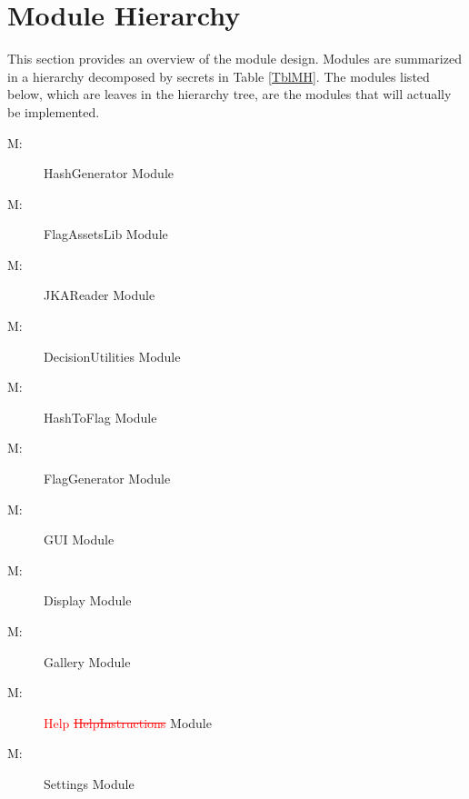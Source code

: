 \documentclass[12pt, titlepage]{article}
\newcounter{mnum}
\newcommand{\mthemnum}{M\themnum}
\begin{document}
\section{Module Hierarchy} \label{SecMH}

This section provides an overview of the module design. Modules are summarized
in a hierarchy decomposed by secrets in Table \ref{TblMH}. The modules listed
below, which are leaves in the hierarchy tree, are the modules that will
actually be implemented.

\begin{description}
\item [ \mthemnum \label{M1}:] HashGenerator Module
\item [ \mthemnum \label{M2}:] FlagAssetsLib Module
\item [ \mthemnum \label{M3}:] JKAReader Module
\item [ \mthemnum \label{M4}:] DecisionUtilities Module
\item [ \mthemnum \label{M5}:] HashToFlag Module
\item [ \mthemnum \label{M6}:] FlagGenerator Module
\item [ \mthemnum \label{M7}:] GUI Module
\item [ \mthemnum \label{M8}:] Display Module
\item [ \mthemnum \label{M9}:] Gallery Module
\item [ \mthemnum \label{M10}:] \textcolor{red}{Help
  \sout{HelpInstructions}} Module
\item [ \mthemnum \label{M11}:] Settings Module
\end{description}
\end{document}
